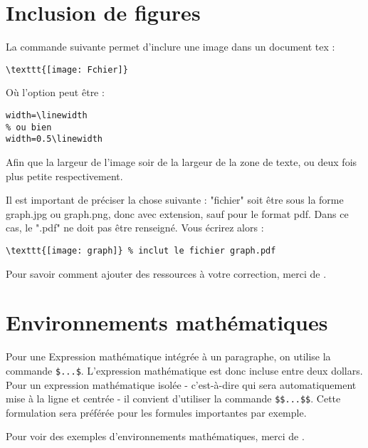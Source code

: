 \section{Inclusion de figures}
La commande suivante permet d'inclure une image dans un document tex :
\begin{verbatim}
\texttt{[image: Fchier]}
\end{verbatim}
Où l'option peut être :
\begin{verbatim}
width=\linewidth
% ou bien
width=0.5\linewidth
\end{verbatim}
Afin que la largeur de l'image soir de la largeur de la zone de texte, ou deux fois plus petite respectivement.

Il est important de préciser la chose suivante : "fichier" soit être sous la forme graph.jpg ou graph.png, donc avec extension, sauf pour le format pdf. Dans ce cas, le ".pdf" ne doit pas être renseigné. Vous écrirez alors :
\begin{verbatim}
\texttt{[image: graph]} % inclut le fichier graph.pdf
\end{verbatim}

Pour savoir comment ajouter des ressources à votre correction, merci de .

\section{Environnements mathématiques}
Pour une Expression mathématique intégrée à un paragraphe, on utilise la commande \verb?$...$?. L'expression mathématique est donc incluse entre deux dollars. Pour un expression mathématique isolée - c'est-à-dire qui sera automatiquement mise à la ligne et centrée - il convient d'utiliser la commande \verb?$$...$$?. Cette formulation sera préférée pour les formules importantes par exemple.

Pour voir des exemples d'environnements mathématiques, merci de .